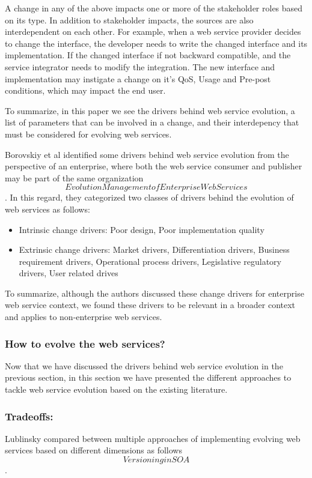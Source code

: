 \documentclass[runningheads,a4paper]{llncs}
\begin{document}
A change in any of the above impacts one or more of the stakeholder roles based on its type. In addition to stakeholder impacts, the sources are also interdependent on each other. For example, when a web service provider decides to change the interface, the developer needs to write the changed interface and its implementation. If the changed interface if not backward compatible, and the service integrator needs to modify the integration. The new interface and implementation may instigate a change on it’s QoS, Usage and Pre-post conditions, which may impact the end user.

To summarize, in this paper we see the drivers behind web service evolution, a list of parameters that can be involved in a change, and their interdepency that must be considered for evolving web services.

Borovskiy et al identified some drivers behind web service evolution from the perspective of an enterprise, where both the web service consumer and publisher may be part of the same organization \[Evolution Management of Enterprise Web Services\]. In this regard, they categorized two classes of drivers behind the evolution of web services as follows:

\begin{itemize}
  \item Intrinsic change drivers: Poor design, Poor implementation quality
  \item Extrinsic change drivers: Market drivers, Differentiation drivers, Business requirement drivers, Operational process drivers, Legislative regulatory drivers, User related drives
\end{itemize}

To summarize, although the authors discussed these change drivers for enterprise web service context, we found these drivers to be relevant in a broader context and applies to non-enterprise web services.

\subsubsection{How to evolve the web services?} %
\label{sub:how_to_evolve_the_web_services_}
Now that we have discussed the drivers behind web service evolution in the previous section, in this section we have presented the different approaches to tackle web service evolution based on the existing literature.

\subsubsection{Tradeoffs:} %
Lublinsky compared between multiple approaches of implementing evolving web services based on different dimensions as follows \[Versioning in SOA\].
\end{document}
